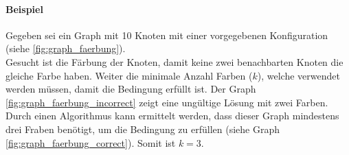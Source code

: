	\paragraph{Beispiel}
	Gegeben sei ein Graph mit 10 Knoten mit einer vorgegebenen Konfiguration (siehe \autoref{fig:graph_faerbung}).\\
	Gesucht ist die Färbung der Knoten, damit keine zwei benachbarten Knoten die gleiche Farbe haben. Weiter die minimale Anzahl Farben ($k$), welche verwendet werden müssen, damit 
	die Bedingung erfüllt ist. Der Graph \ref{fig:graph_faerbung_incorrect} zeigt eine ungültige Lösung mit zwei Farben. Durch einen Algorithmus kann ermittelt werden, dass dieser Graph 
	mindestens drei Fraben benötigt, um die Bedingung zu erfüllen (siehe Graph \ref{fig:graph_faerbung_correct}). Somit ist $k=3$.
\begin{figure}[ht]
\centering
{}
\end{figure}
